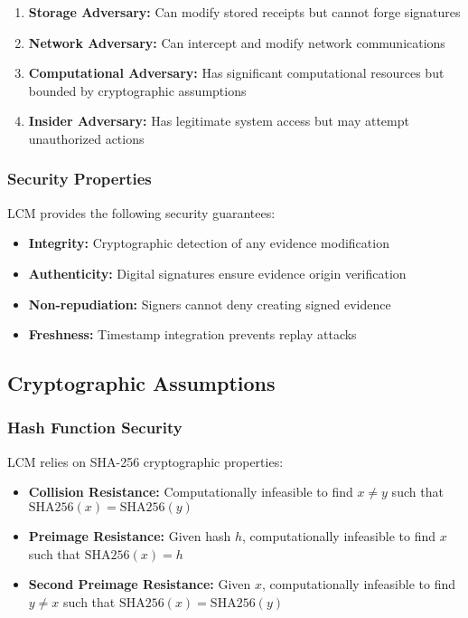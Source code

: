 \documentclass[12pt,a4paper]{article}
\begin{document}
\begin{enumerate}
\item \textbf{Storage Adversary:} Can modify stored receipts but cannot forge signatures
\item \textbf{Network Adversary:} Can intercept and modify network communications
\item \textbf{Computational Adversary:} Has significant computational resources but bounded by cryptographic assumptions
\item \textbf{Insider Adversary:} Has legitimate system access but may attempt unauthorized actions
\end{enumerate}

\subsubsection{Security Properties}

LCM provides the following security guarantees:

\begin{itemize}
\item \textbf{Integrity:} Cryptographic detection of any evidence modification
\item \textbf{Authenticity:} Digital signatures ensure evidence origin verification
\item \textbf{Non-repudiation:} Signers cannot deny creating signed evidence
\item \textbf{Freshness:} Timestamp integration prevents replay attacks
\end{itemize}

\subsection{Cryptographic Assumptions}

\subsubsection{Hash Function Security}

LCM relies on SHA-256 cryptographic properties:

\begin{itemize}
\item \textbf{Collision Resistance:} Computationally infeasible to find $x \neq y$ such that $\text{SHA256}(x) = \text{SHA256}(y)$
\item \textbf{Preimage Resistance:} Given hash $h$, computationally infeasible to find $x$ such that $\text{SHA256}(x) = h$
\item \textbf{Second Preimage Resistance:} Given $x$, computationally infeasible to find $y \neq x$ such that $\text{SHA256}(x) = \text{SHA256}(y)$
\end{itemize}
\end{document}
